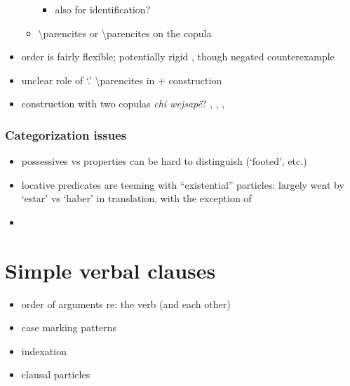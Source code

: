 \documentclass{memoir}
\begin{document}
\begin{itemize}
\begin{itemize}
    \begin{itemize}
    \tightlist
    \item
      also for identification? 
    \end{itemize}
  \item
     \textbackslash parencites or 
    \textbackslash parencites on the copula
  \end{itemize}
\item
  order is fairly flexible; potentially rigid
  \textsubscript{} \textsubscript{}
  , though negated counterexample 
\item
  unclear role of  `.'
  \textbackslash parencites in  + 
  construction
\item
  construction with two copulas \emph{chi wejsapë}?
  , ,
  , 
\end{itemize}

\subsection{Categorization issues}

\begin{itemize}
\item
  possessives vs properties can be hard to distinguish (`footed', etc.)
\item
  locative predicates are teeming with ``existential'' particles:
  largely went by `estar' vs `haber' in translation, with the exception
  of 
\item
\end{itemize}

\chapter{\texorpdfstring{Simple verbal clauses
\label{simpleverb}}{Simple verbal clauses }}

\begin{itemize}
\tightlist
\item
  order of arguments re: the verb (and each other)
\item
  case marking patterns
\item
  indexation
\item
  clausal particles
\end{itemize}
\end{document}
